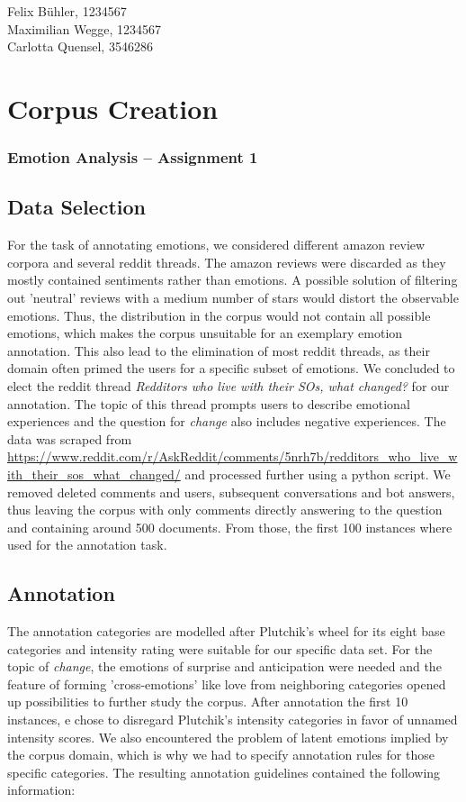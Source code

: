 \documentclass[a4,12pt]{scrartcl}
\begin{document}
\begin{flushright}
Felix Bühler, 1234567\\
Maximilian Wegge, 1234567\\
Carlotta Quensel, 3546286
\end{flushright}

\section*{Corpus Creation}
\subsubsection*{Emotion Analysis -- Assignment 1}
\subsection*{Data Selection}
For the task of annotating emotions, we considered different amazon review corpora and several reddit threads. The amazon reviews were discarded as they mostly contained sentiments rather than emotions. A possible solution of filtering out 'neutral' reviews with a medium number of stars would distort the observable emotions. Thus, the distribution in the corpus would not contain all possible emotions, which makes the corpus unsuitable for an exemplary emotion annotation. This also lead to the elimination of most reddit threads, as their domain often primed the users for a specific subset of emotions. We concluded to elect the reddit thread \textit{Redditors who live with their SOs, what changed?} for our annotation. The topic of this thread prompts users to describe emotional experiences and the question for \textit{change} also includes negative experiences. The data was scraped from \url{https://www.reddit.com/r/AskReddit/comments/5nrh7b/redditors_who_live_with_their_sos_what_changed/} and processed further using a python script. We removed deleted comments and users, subsequent conversations and bot answers, thus leaving the corpus with only comments directly answering to the question and containing around 500 documents. From those, the first 100 instances where used for the annotation task.

\subsection*{Annotation}
The annotation categories are modelled after Plutchik's wheel for its eight base categories and intensity rating were suitable for our specific data set. For the topic of \textit{change}, the emotions of surprise and anticipation were needed and the feature of forming 'cross-emotions' like love from neighboring categories opened up possibilities to further study the corpus. After annotation the first 10 instances, e chose to disregard Plutchik's intensity categories in favor of unnamed intensity scores. We also encountered the problem of latent emotions implied by the corpus domain, which is why we had to specify annotation rules for those specific categories. The resulting annotation guidelines contained the following information:
\end{document}
